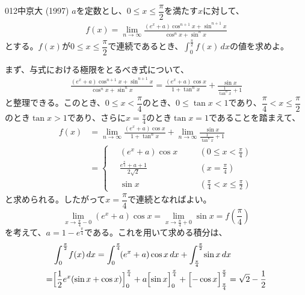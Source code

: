 \begin{prob}{012}{}{中京大 (1997)}
 $a$を定数とし、$0\le x \le \dfrac{\pi}{2}$を満たす$x$に対して、
 \begin{align*}
  f(x)=\lim_{n\rightarrow\infty}\frac{(e^x+a)\cos^{n+1}x+\sin^{n+1}x}{\cos^nx+\sin^nx}
 \end{align*}
 とする。$f(x)$が$0\le x \le \dfrac{\pi}{2}$で連続であるとき、$\displaystyle \int^{\frac{\pi}{2}}_0\!\! f(x) \,dx$の値を求めよ。
\end{prob}

まず、与式における極限をとるべき式について、
\begin{align*}
 \frac{(e^x+a)\cos^{n+1}x+\sin^{n+1}x}{\cos^nx+\sin^nx}=\frac{(e^x+a)\cos x}{1+\tan^n x}+\frac{\sin x}{\frac{1}{\tan^n x}+1}
\end{align*}
と整理できる。このとき、$0\le x<\dfrac{\pi}{4}$のとき、$0\le\tan x<1$であり、$\dfrac{\pi}{4}<x\le\dfrac{\pi}{2}$のとき$\tan x>1$であり、さらに$x=\frac{\pi}{4}$のとき$\tan x=1$であることを踏まえて、
\begin{align*}
 f(x)&=\lim_{n\to\infty} \frac{(e^x+a)\cos x}{1+\tan^n x}+ \lim_{n\to\infty} \frac{\sin x}{\frac{1}{\tan^n x}+1} \\
 &=\left\{\,
 \begin{alignedat}{2}
  &(e^x+a)\cos x & &\left(0\le x<\frac{\pi}{4}\right) \\
  &\frac{e^\frac{\pi}{4}+a+1}{2\sqrt{2}} & \quad &\left(x=\frac{\pi}{4}\right) \\
  &\sin x & &\left(\frac{\pi}{4}<x\le\frac{\pi}{2}\right)
 \end{alignedat} \right.
\end{align*}
と求められる。したがって$x=\dfrac{\pi}{4}$で連続となればよい。
\[ \lim_{x\to\frac{\pi}{4}-0} (e^x+a)\cos x = \lim_{x\to\frac{\pi}{4}+0} \sin x = f\left(\frac{\pi}{4}\right) \]
を考えて、$a=1-e^\frac{\pi}{4}$である。これを用いて求める積分は、
\begin{align*}
 &\int_0^{\frac{\pi}{2}}\! f(x) \,dx = \int_0^{\frac{\pi}{4}}\! (e^x+a)\cos x \,dx + \int_{\frac{\pi}{4}}^{\frac{\pi}{2}}\! \sin x \,dx \\
 =& \Bigl[\frac{1}{2}e^x(\sin x+\cos x)\Bigr]_0^{\frac{\pi}{4}}+a\Bigl[\sin x \Bigr]_0^{\frac{\pi}{4}}+\Bigl[-\cos x\Bigr]_{\frac{\pi}{4}}^{\frac{\pi}{2}} = \sqrt{2}-\frac{1}{2}
\end{align*}



